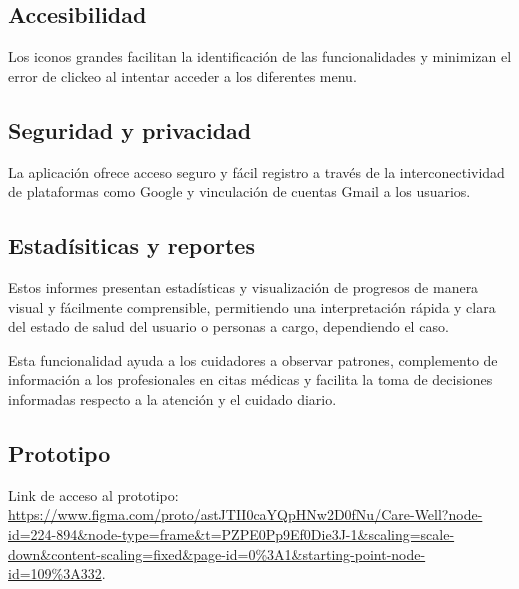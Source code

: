 \documentclass[a4paper,12pt]{article}
\begin{document}
    \subsection{Accesibilidad}
    \par Los iconos grandes facilitan la identificación de las funcionalidades y minimizan el error de clickeo al intentar acceder a los diferentes menu.
    \subsection{Seguridad y privacidad}
    \par La aplicación ofrece acceso seguro y fácil registro a través de la interconectividad de plataformas como Google y vinculación de cuentas Gmail a los usuarios.
    \subsection{Estadísiticas y reportes}
    \par Estos informes presentan estadísticas y visualización de progresos de manera visual y fácilmente comprensible, permitiendo una interpretación rápida y clara del estado de salud del usuario o personas a cargo, dependiendo el caso. 
    \par Esta funcionalidad ayuda a los cuidadores a observar patrones, complemento de información a los profesionales en citas médicas y facilita la toma de decisiones informadas respecto a la atención y el cuidado diario.
    \subsection{Prototipo}
    \par Link de acceso al prototipo: 
    \\
    \url{https://www.figma.com/proto/astJTII0caYQpHNw2D0fNu/Care-Well?node-id=224-894&node-type=frame&t=PZPE0Pp9Ef0Die3J-1&scaling=scale-down&content-scaling=fixed&page-id=0%3A1&starting-point-node-id=109%3A332}.

    
    


    \newpage

    \printbibliography[heading=bibintoc]
\end{document}

